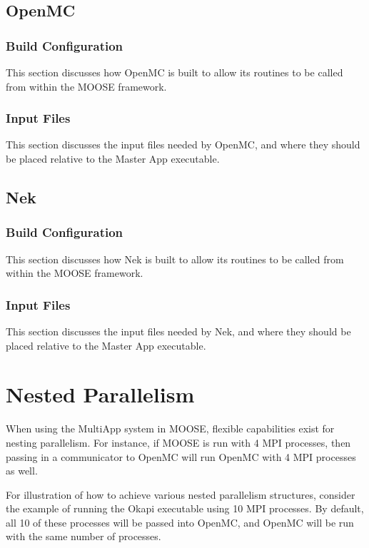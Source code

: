 \documentclass[10pt]{article}
\numberwithin{equation}{section} %
\begin{document}
\subsection{OpenMC}

\subsubsection{Build Configuration}
This section discusses how OpenMC is built to allow its routines to be called from within the MOOSE framework.

\subsubsection{Input Files}
This section discusses the input files needed by OpenMC, and where they should be placed relative to the Master App executable.

\subsection{Nek}

\subsubsection{Build Configuration}
This section discusses how Nek is built to allow its routines to be called from within the MOOSE framework.

\subsubsection{Input Files}
This section discusses the input files needed by Nek, and where they should be placed relative to the Master App executable.

\section{Nested Parallelism}
When using the MultiApp system in MOOSE, flexible capabilities exist for nesting parallelism. For instance, if MOOSE is run with 4 MPI processes, then passing in a communicator to OpenMC will run OpenMC with 4 MPI processes as well. 

For illustration of how to achieve various nested parallelism structures, consider the example of running the Okapi executable using 10 MPI processes. By default, all 10 of these processes will be passed into OpenMC, and OpenMC will be run with the same number of processes. 
\end{document}
